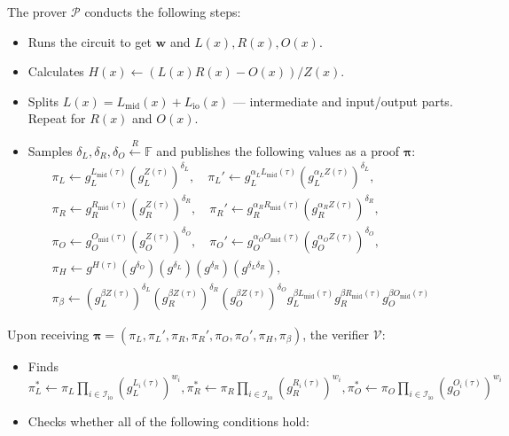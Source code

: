 \documentclass[../lecture-notes-148x210.tex]{subfiles}
\begin{document}
\begin{tcolorbox}
    The prover $\mathcal{P}$ conducts the following steps:
    \begin{itemize}[label=]
        \item Runs the circuit to get $\mathbf{w}$ and $L(x),R(x),O(x)$.
        \item Calculates $H(x) \gets (L(x)R(x) - O(x))\big/ Z(x)$.
        \item Splits $L(x) = L_{\text{mid}}(x) + L_{\text{io}}(x)$ --- intermediate and input/output parts. Repeat for $R(x)$ and $O(x)$.
        \item Samples $\delta_L, \delta_R, \delta_O \xleftarrow{R} \mathbb{F}$ and publishes the following values as a proof $\boldsymbol{\pi}$: 
        \begin{align*}
            \pi_L \gets g_L^{L_{\text{mid}}(\tau)}\left(g_L^{Z(\tau)}\right)^{\delta_L}, \quad \pi_L' \gets g_L^{\alpha_LL_{\text{mid}}(\tau)}\left(g_L^{\alpha_L Z(\tau)}\right)^{\delta_L}, \\
            \pi_R \gets g_R^{R_{\text{mid}}(\tau)}\left(g_R^{Z(\tau)}\right)^{\delta_R}, \quad \pi_R' \gets g_R^{\alpha_RR_{\text{mid}}(\tau)}\left(g_R^{\alpha_R Z(\tau)}\right)^{\delta_R}, \\
            \pi_O \gets g_O^{O_{\text{mid}}(\tau)}\left(g_O^{Z(\tau)}\right)^{\delta_O}, \quad \pi_O' \gets g_O^{\alpha_OO_{\text{mid}}(\tau)}\left(g_O^{\alpha_O Z(\tau)}\right)^{\delta_O}, \\
            \pi_H \gets g^{H(\tau)}(g^{\delta_O})(g^{\delta_L})(g^{\delta_R})(g^{\delta_L\delta_R}), \\ 
            \pi_{\beta} \gets \left(g_L^{\beta Z(\tau)}\right)^{\delta_L}\left(g_R^{\beta Z(\tau)}\right)^{\delta_R}\left(g_O^{\beta Z(\tau)}\right)^{\delta_O}g_L^{\beta L_{\text{mid}}(\tau)}g_R^{\beta R_{\text{mid}}(\tau)}g_O^{\beta O_{\text{mid}}(\tau)}
        \end{align*}
    \end{itemize}

    Upon receiving $\boldsymbol{\pi} = (\pi_L,\pi_L',\pi_R,\pi_R',\pi_O,\pi_O',\pi_H,\pi_{\beta})$, the verifier $\mathcal{V}$:
    \begin{itemize}[label=]
        \item Finds $\pi_L^* \gets \pi_L\prod_{i \in \mathcal{I}_{\text{io}}} (g_L^{L_i(\tau)})^{w_i},\pi_R^* \gets \pi_R\prod_{i \in \mathcal{I}_{\text{io}}} (g_R^{R_i(\tau)})^{w_i},\pi_O^* \gets \pi_O\prod_{i \in \mathcal{I}_{\text{io}}} (g_O^{O_i(\tau)})^{w_i}$
        \item Checks whether all of the following conditions hold:
        

\end{itemize}
\end{tcolorbox}
\end{document}
